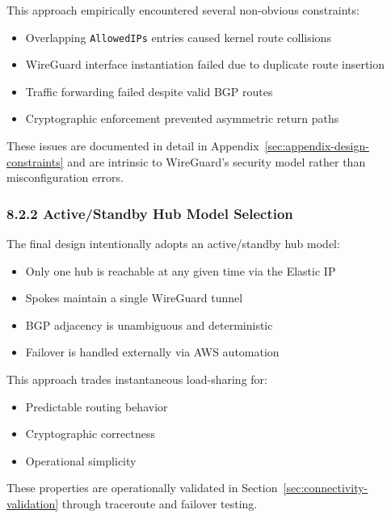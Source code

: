 \documentclass[11pt]{article}
\begin{document}
This approach empirically encountered several non-obvious constraints:
\begin{itemize}
\item Overlapping \texttt{AllowedIPs} entries caused kernel route collisions
\item WireGuard interface instantiation failed due to duplicate route insertion
\item Traffic forwarding failed despite valid BGP routes
\item Cryptographic enforcement prevented asymmetric return paths
\end{itemize}

These issues are documented in detail in Appendix~\ref{sec:appendix-design-constraints} and are intrinsic to WireGuard’s security model rather than misconfiguration errors.

%
%
\subsubsection{8.2.2 Active/Standby Hub Model Selection}
\label{subsubsec:active-standby-selection}

The final design intentionally adopts an active/standby hub model:
\begin{itemize}
\item Only one hub is reachable at any given time via the Elastic IP
\item Spokes maintain a single WireGuard tunnel
\item BGP adjacency is unambiguous and deterministic
\item Failover is handled externally via AWS automation
\end{itemize}

This approach trades instantaneous load-sharing for:
\begin{itemize}
\item Predictable routing behavior
\item Cryptographic correctness
\item Operational simplicity
\end{itemize}

These properties are operationally validated in Section~\ref{sec:connectivity-validation} through traceroute and failover testing.
\end{document}
